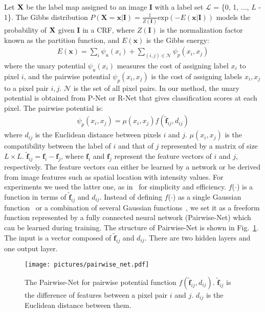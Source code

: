 \documentclass[10pt,journal,compsoc]{IEEEtran}
\begin{document}
Let $\bf{X}$ be the label map assigned to an image $\mathbf{I}$ with a label set $\mathcal{L}$ = \{0, 1, ..., $L$ - 1\}. The Gibbs distribution 
$P(\mathbf{X}=\mathbf{x}|\mathbf{I}) = \frac{1}{Z(\mathbf{I})}\text{exp}(-E(\mathbf{x}|\mathbf{I}))$ models the probability of $\bf{X}$ given $\mathbf{I}$ in a CRF, where $Z(\mathbf{I})$ is the normalization factor known as the partition function, and $E(\mathbf{x})$ is the Gibbs energy:
\begin{align}
E(\mathbf{x}) = \sum_{i}\psi_u(x_i) + \sum_{(i,j)\in \mathcal N}\psi_p(x_i, x_j)
\label{eq:crf_energy}
\end{align}
where the unary potential $\psi_u(x_i)$ measures the cost of assigning label $x_i$ to pixel $i$, and the pairwise potential $\psi_p(x_i, x_j)$ is the cost of assigning labels $x_i, x_j$ to a pixel pair $i, j$. $\mathcal N$ is the set of all pixel pairs. In our method, the unary potential is obtained from P-Net or R-Net that gives classification scores at each pixel. The pairwise potential is:
\begin{align}
\psi_p(x_i, x_j)= \mu(x_i,x_j)f(\mathbf{\tilde{f}}_{ij}, d_{ij})
\label{eq:pairwise_potential}
\end{align}
where $d_{ij}$ is the Euclidean distance between pixels $i$ and $j$. $\mu(x_i,x_j)$ is the compatibility between the label of $i$ and that of $j$ represented by a matrix of size $L\times L$.  $\mathbf{\tilde{f}}_{ij} = \mathbf{f}_i - \mathbf{f}_j$, where $\mathbf{f}_i$ and $\mathbf{f}_j$ represent the feature vectors of $i$ and $j$, respectively.  The feature vectors can either be learned by a network or be derived from image features such as spatial location with intensity values. For experiments we used the latter one, as in~\cite{Zheng2015a, Krahenbuhl2011, Boykov2001} for simplicity and efficiency. $f$($\cdot$) is a function in terms of $\mathbf{\tilde{f}}_{ij}$ and $d_{ij}$. Instead of defining $f$($\cdot$) as a single Gaussian function~\cite{Boykov2001} or a combination of several Gaussian functions~\cite{Zheng2015a, Krahenbuhl2011}, we set it as a freeform function represented by a fully connected neural network (Pairwise-Net) which can be learned during training. The structure of Pairwise-Net is shown in Fig.~\ref{fig:pairwise-net}. The input is a vector composed of $\mathbf{\tilde{f}}_{ij}$ and $d_{ij}$. There are two hidden layers and one output layer.%
\begin{figure}[t]
	\centering
	\texttt{[image: pictures/pairwise\_net.pdf]}
	\caption[The Pairwise-Net for pairwise potential function]{ 
	The Pairwise-Net for pairwise potential function $f(\mathbf{\tilde{f}}_{ij}, d_{ij})$. $\mathbf{\tilde{f}}_{ij}$ is the difference of features between a pixel pair $i$ and $j$. $d_{ij}$ is the Euclidean distance between them. %
	} 
	\label{fig:pairwise-net}
\end{figure}
\end{document}
